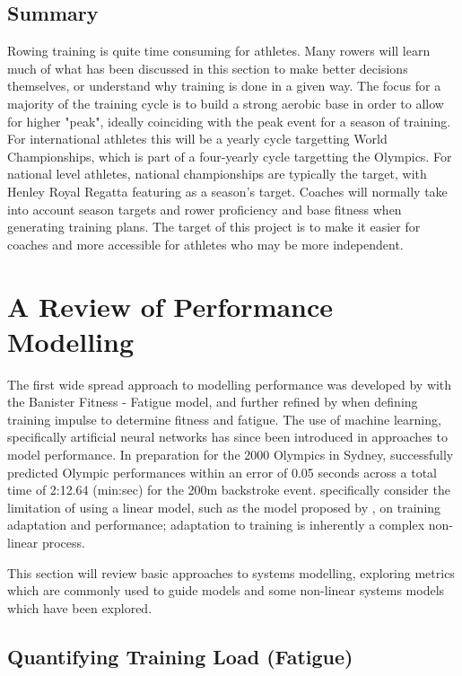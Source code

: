 \subsection{Summary}
Rowing training is quite time consuming for athletes. Many rowers will learn much of what has been discussed in this section to make better decisions themselves, or understand why training is done in a given way. The focus for a majority of the training cycle is to build a strong aerobic base in order to allow for higher "peak", ideally coinciding with the peak event for a season of training. For international athletes this will be a yearly cycle targetting World Championships, which is part of a four-yearly cycle targetting the Olympics. For national level athletes, national championships are typically the target, with Henley Royal Regatta featuring as a season's target. Coaches will normally take into account season targets and rower proficiency and base fitness when generating training plans. The target of this project is to make it easier for coaches and more accessible for athletes who may be more independent. 

\section{A Review of Performance Modelling}
The first wide spread approach to modelling performance was developed by \textcite{Bannister1976} with the Banister Fitness - Fatigue model, and further refined by \textcite{Morton1990} when defining training impulse to determine fitness and fatigue. The use of machine learning, specifically artificial neural networks has since been introduced in approaches to model performance. In preparation for the 2000 Olympics in Sydney, \textcite{Edelmannnusser2002} successfully predicted Olympic performances within an error of 0.05 seconds across a total time of 2:12.64 (min:sec) for the 200m backstroke event. \textcite{Edelmannnusser2002} specifically consider the limitation of using a linear model, such as the model proposed by \textcite{Bannister1976}, on training adaptation and performance; adaptation to training is inherently a complex non-linear process. 

This section will review basic approaches to systems modelling, exploring metrics which are commonly used to guide models and some non-linear systems models which have been explored. 

\subsection{\label{sec:quant-training}Quantifying Training Load (Fatigue)}
